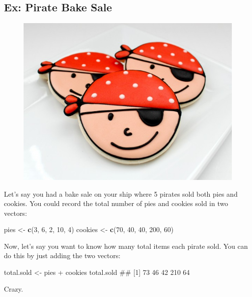 \documentclass[]{book}
\newenvironment{Shaded}{\begin{snugshade}}{\end{snugshade}}
\newcommand{\KeywordTok}[1]{\textcolor[rgb]{0.13,0.29,0.53}{\textbf{{#1}}}}
\newcommand{\DecValTok}[1]{\textcolor[rgb]{0.00,0.00,0.81}{{#1}}}
\newcommand{\StringTok}[1]{\textcolor[rgb]{0.31,0.60,0.02}{{#1}}}
\newcommand{\NormalTok}[1]{{#1}}
\theoremstyle{definition}
\theoremstyle{definition}
\theoremstyle{remark}
\begin{document}
\subsection{Ex: Pirate Bake Sale}\label{ex-pirate-bake-sale}

\begin{figure}

{\centering \includegraphics[width=0.5\linewidth]{images/piratecookies} 

}

\end{figure}

Let's say you had a bake sale on your ship where 5 pirates sold both
pies and cookies. You could record the total number of pies and cookies
sold in two vectors:

\begin{Shaded}
\begin{Highlighting}[]
\NormalTok{pies <-}\StringTok{ }\KeywordTok{c}\NormalTok{(}\DecValTok{3}\NormalTok{, }\DecValTok{6}\NormalTok{, }\DecValTok{2}\NormalTok{, }\DecValTok{10}\NormalTok{, }\DecValTok{4}\NormalTok{)}
\NormalTok{cookies <-}\StringTok{ }\KeywordTok{c}\NormalTok{(}\DecValTok{70}\NormalTok{, }\DecValTok{40}\NormalTok{, }\DecValTok{40}\NormalTok{, }\DecValTok{200}\NormalTok{, }\DecValTok{60}\NormalTok{)}
\end{Highlighting}
\end{Shaded}

Now, let's say you want to know how many total items each pirate sold.
You can do this by just adding the two vectors:

\begin{Shaded}
\begin{Highlighting}[]
\NormalTok{total.sold <-}\StringTok{ }\NormalTok{pies +}\StringTok{ }\NormalTok{cookies}
\NormalTok{total.sold}
\NormalTok{## [1]  73  46  42 210  64}
\end{Highlighting}
\end{Shaded}

Crazy.
\end{document}
